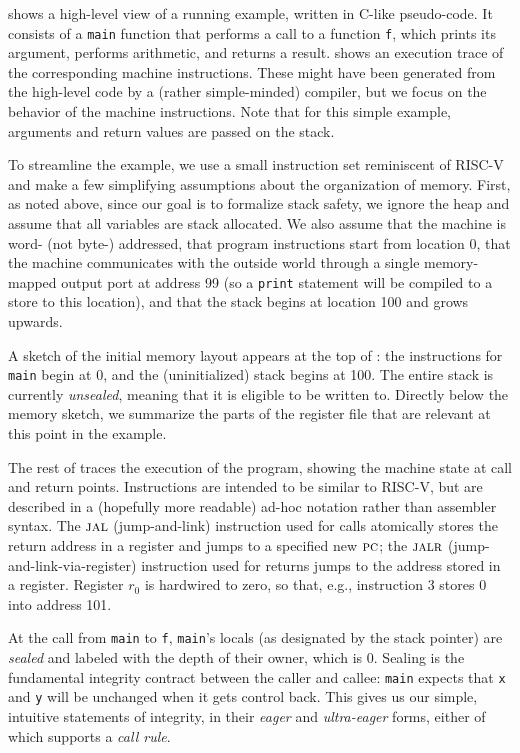  shows a high-level view of a running example,
written in C-like pseudo-code.  It consists of a {\tt main} function that
performs a call to a function {\tt f}, which prints its argument, performs
arithmetic, and returns a result.  shows an
execution trace of the corresponding machine instructions. These might have
been generated from the high-level code by a (rather simple-minded) compiler,
but we focus on the behavior of the machine instructions. Note that for this
simple example, arguments and return values are passed on the stack.

To streamline the example, we use a small instruction set reminiscent of
RISC-V and make a few simplifying assumptions about the organization of
memory.
%
First, as noted above, since our goal is to formalize stack safety, we
ignore the heap and assume that all variables are stack allocated.
%
We also assume that the machine is word- (not byte-) addressed, that program
instructions start from location 0, that the machine communicates with the
outside world through a single memory-mapped output port at address 99 (so
a {\tt print} statement will be compiled to a store to this
location), and that the stack begins at location 100 and grows upwards.

A sketch of the initial memory layout appears at the top of
: the instructions for {\tt main} begin at 0,
and the (uninitialized) stack begins at 100. The entire stack is currently
{\em unsealed}, meaning that it is eligible to be written to.
Directly below the memory sketch, we summarize the parts
of the register file that are relevant at this point in the example.

The rest of  traces the execution of the
program, showing the machine state at call and return points.
Instructions are intended to be similar to RISC-V, but are described
in a (hopefully more readable) ad-hoc notation rather than assembler
syntax. The $\textsc{jal}$ (jump-and-link) instruction used for calls atomically
stores the return address in a register and jumps to a specified new $\textsc{pc}$;
the $\textsc{jalr}$ (jump-and-link-via-register) instruction used for returns jumps
to the address stored in a register. Register $r_0$ is hardwired to zero,
so that, e.g., instruction 3 stores $0$ into address 101.

At the call from {\tt main} to {\tt f}, {\tt main}'s locals (as
designated by the stack pointer) are {\em sealed} and labeled with the depth
of their owner, which is 0. Sealing is the fundamental integrity contract
between the caller and callee: {\tt main} expects that {\tt x} and {\tt y}
will be unchanged when it gets control back. This gives us our simple,
intuitive statements of integrity, in their {\em eager} and {\em ultra-eager}
forms, either of which supports a {\em call rule}.

